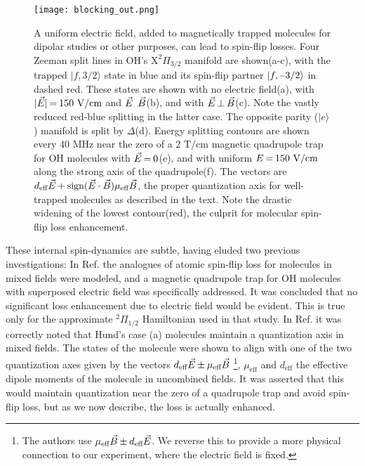 \documentclass[%
 reprint,
 amsmath,amssymb,
 aps,
prl,
]{revtex4-1}
\newcommand{\epb}{{$\vec{E}\s {\perp}\s\vec{B}$}}
\newcommand{\s}{{\nobreak\hspace{.2em}}}
\begin{document}
\begin{figure}[tb]
\texttt{[image: blocking\_out.png]}%
\caption{
A uniform electric field, added to magnetically trapped molecules for dipolar studies or other purposes, can lead to spin-flip losses. 
Four Zeeman split lines in OH's $\mathrm{X}^2\Pi_{3/2}$ manifold are shown\s(a-c), with the trapped $|f,3/2\rangle$ state in blue and its spin-flip partner $|f,\protect\scalebox{0.75}[1.0]{$-$}3/2\rangle$ in dashed red. 
These states are shown with no electric field\s(a), with $|\vec{E}|\s {=}\s 150\text{ V/cm}$ and $\vec{E}\s $\raisebox{1px}{${\parallel}$}$\s\vec{B}$\s(b), and with \epb{}\s(c). 
Note the vastly reduced red-blue splitting in the latter case. 
The opposite parity ($|e\rangle$) manifold is split by $\Delta$\s(d). 
Energy splitting contours are shown every $40\text{ MHz}$ near the zero of a $2\text{ T/cm}$ magnetic quadrupole trap for OH molecules\s\cite{Stuhl2012uwave} with $\vec{E}\s {=}\s 0$\s(e), and with uniform $E\s {=}\s 150\text{ V/cm}$ along the strong axis of the quadrupole\s(f). 
The vectors are $d_\text{eff}\vec{E}\s {+}\s\text{sign}(\vec{E}\cdot\vec{B})\mu_\text{eff}\vec{B}$, the proper quantization axis for well-trapped molecules as described in the text. 
Note the drastic widening of the lowest contour\s(red), the culprit for molecular spin-flip loss enhancement.
}
\label{fig:blocking}
\end{figure}

These internal spin-dynamics are subtle, having eluded two previous investigations: In Ref.\s\cite{Lara2008} the analogues of atomic spin-flip loss for molecules in mixed fields were modeled, and a magnetic quadrupole trap for OH molecules with superposed electric field was specifically addressed. 
It was concluded that no significant loss enhancement due to electric field would be evident. 
This is true only for the approximate $^2\Pi_{1/2}$ Hamiltonian used in that study. 
In Ref.\s\cite{Bohn2013} it was correctly noted that Hund's case (a) molecules maintain a quantization axis in mixed fields. 
The states of the molecule were shown to align with one of the two quantization axes given by the vectors $d_\text{eff}\vec{E} \s {\pm}\s  \mu_\text{eff}\vec{B}$
\s\footnote{The authors use $\mu_\text{eff}\vec{B} \s {\pm}\s  d_\text{eff}\vec{E}$. We reverse this to provide a more physical connection to our experiment, where the electric field is fixed.}, $\mu_\text{eff}$ and $d_\text{eff}$ the effective dipole moments of the molecule in uncombined fields. 
It was asserted that this would maintain quantization near the zero of a quadrupole trap and avoid spin-flip loss, but as we now describe, the loss is actually enhanced.
\end{document}
